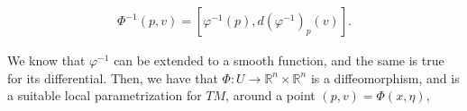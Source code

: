 \begin{solution}[9.3]
\begin{align}
\Phi^{-1}(p, v) = \left[\varphi^{-1}(p), d(\varphi^{-1})_p(v)\right].
\end{align}

We know that $\varphi^{-1}$ can be extended to a smooth function, and the same is true for its differential. Then, we have that $\Phi: U\to \mathbb{R}^n\times \mathbb{R}^n$ is a diffeomorphism, and is a suitable local parametrization for $TM$, around a point $(p,v)=\Phi(x, \eta)$,
\end{solution}

